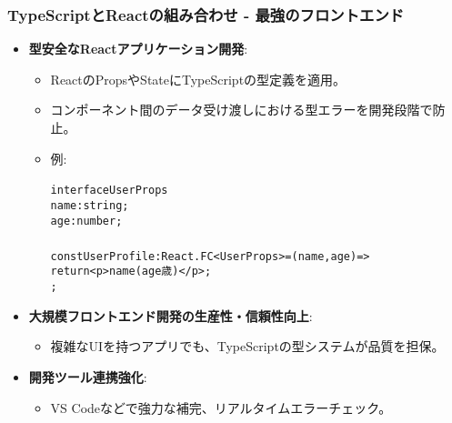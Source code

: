 \documentclass{beamer}
\begin{document}
\begin{frame}
    \frametitle{TypeScriptとReactの組み合わせ - 最強のフロントエンド}
    \begin{itemize}
        \item \textbf{型安全なReactアプリケーション開発}:
            \begin{itemize}
                \item ReactのPropsやStateにTypeScriptの型定義を適用。
                \item コンポーネント間のデータ受け渡しにおける型エラーを開発段階で防止。
                \item 例:
                \begin{alltt}
interface UserProps {
  name: string;
  age: number;
}
const UserProfile: React.FC<UserProps> = ({ name, age }) => {
  return <p>{name} ({age}歳)</p>;
};
                \end{alltt}
            \end{itemize}
        \item \textbf{大規模フロントエンド開発の生産性・信頼性向上}:
            \begin{itemize}
                \item 複雑なUIを持つアプリでも、TypeScriptの型システムが品質を担保。
            \end{itemize}
        \item \textbf{開発ツール連携強化}:
            \begin{itemize}
                \item VS Codeなどで強力な補完、リアルタイムエラーチェック。
            \end{itemize}
    \end{itemize}
\end{frame}
\end{document}
